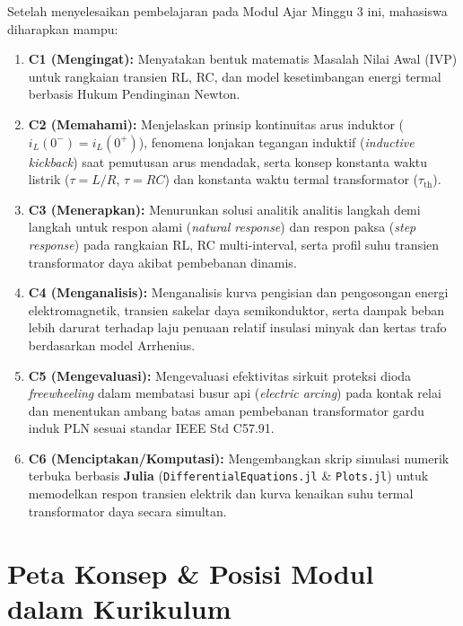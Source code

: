 \documentclass[11pt,a4paper]{article}
\theoremstyle{definition}
\begin{document}
\begin{tcolorbox}[colback=blue!5!white,colframe=headercolor,title=\textbf{Capaian Pembelajaran Khusus (Sub-CPMK 2)}]
Setelah menyelesaikan pembelajaran pada Modul Ajar Minggu 3 ini, mahasiswa diharapkan mampu:
\begin{enumerate}[leftmargin=*]
    \item \textbf{C1 (Mengingat):} Menyatakan bentuk matematis Masalah Nilai Awal (IVP) untuk rangkaian transien RL, RC, dan model kesetimbangan energi termal berbasis Hukum Pendinginan Newton.
    \item \textbf{C2 (Memahami):} Menjelaskan prinsip kontinuitas arus induktor ($i_L(0^-)=i_L(0^+)$), fenomena lonjakan tegangan induktif (\textit{inductive kickback}) saat pemutusan arus mendadak, serta konsep konstanta waktu listrik ($\tau = L/R$, $\tau = RC$) dan konstanta waktu termal transformator ($\tau_{\text{th}}$).
    \item \textbf{C3 (Menerapkan):} Menurunkan solusi analitik analitis langkah demi langkah untuk respon alami (\textit{natural response}) dan respon paksa (\textit{step response}) pada rangkaian RL, RC multi-interval, serta profil suhu transien transformator daya akibat pembebanan dinamis.
    \item \textbf{C4 (Menganalisis):} Menganalisis kurva pengisian dan pengosongan energi elektromagnetik, transien sakelar daya semikonduktor, serta dampak beban lebih darurat terhadap laju penuaan relatif insulasi minyak dan kertas trafo berdasarkan model Arrhenius.
    \item \textbf{C5 (Mengevaluasi):} Mengevaluasi efektivitas sirkuit proteksi dioda \textit{freewheeling} dalam membatasi busur api (\textit{electric arcing}) pada kontak relai dan menentukan ambang batas aman pembebanan transformator gardu induk PLN sesuai standar IEEE Std C57.91.
    \item \textbf{C6 (Menciptakan/Komputasi):} Mengembangkan skrip simulasi numerik terbuka berbasis \textbf{Julia} (\texttt{DifferentialEquations.jl} \& \texttt{Plots.jl}) untuk memodelkan respon transien elektrik dan kurva kenaikan suhu termal transformator daya secara simultan.
\end{enumerate}
\end{tcolorbox}

\vspace{0.3cm}
\tableofcontents
\vspace{0.5cm}

\newpage

\section{Peta Konsep \& Posisi Modul dalam Kurikulum}
\end{document}
